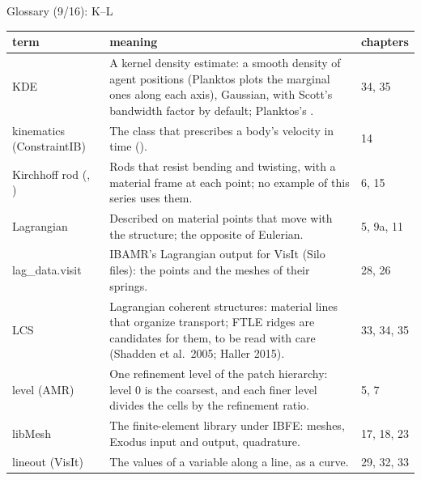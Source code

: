 \documentclass[aspectratio=169,11pt]{beamer}
\makeatletter
\newenvironment{glossarytable}{\scriptsize\renewcommand{\arraystretch}{1.08}%
  \begin{tabular}{@{}L{0.19\textwidth}L{0.63\textwidth}L{0.12\textwidth}@{}}\toprule
  term & meaning & chapters\\\midrule}{\bottomrule\end{tabular}}
\makeatother
\begin{document}
\begin{frame}{Glossary (9/16): K--L}
\label{fr:g9}
\begin{glossarytable}
KDE & A kernel density estimate: a smooth density of agent positions (Planktos plots the marginal ones along each axis), Gaussian, with Scott's bandwidth factor by default; Planktos's . & 34, 35\\
kinematics (ConstraintIB) & The class that prescribes a body's velocity in time (). & 14\\
Kirchhoff rod (, ) & Rods that resist bending and twisting, with a material frame at each point; no example of this series uses them. & 6, 15\\
Lagrangian & Described on material points that move with the structure; the opposite of Eulerian. & 5, 9a, 11\\
lag\_data.visit & IBAMR's Lagrangian output for VisIt (Silo files): the points and the meshes of their springs. & 28, 26\\
LCS & Lagrangian coherent structures: material lines that organize transport; FTLE ridges are candidates for them, to be read with care (Shadden et al.\ 2005; Haller 2015). & 33, 34, 35\\
level (AMR) & One refinement level of the patch hierarchy: level 0 is the coarsest, and each finer level divides the cells by the refinement ratio. & 5, 7\\
libMesh & The finite-element library under IBFE: meshes, Exodus input and output, quadrature. & 17, 18, 23\\
lineout (VisIt) & The values of a variable along a line, as a curve. & 29, 32, 33\\
\end{glossarytable}
\end{frame}
\end{document}
